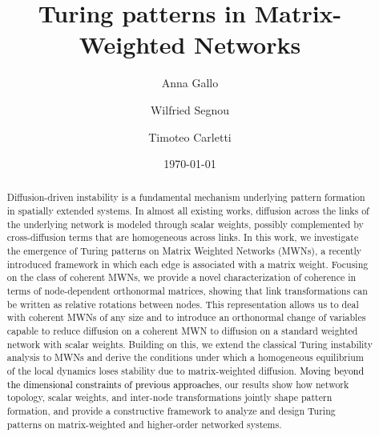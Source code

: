\documentclass[aps,showpacs,preprintnumbers,amsmath,amssymb,twocolumn,superscriptaddress,floatfix,nofootinbib,10pt,pre]{revtex4-1}
\begin{document}
\title{Turing patterns in Matrix-Weighted Networks}

\author{Anna Gallo}

\author{Wilfried Segnou}

\author{Timoteo Carletti}

\date{\today}

\begin{abstract}
Diffusion-driven instability is a fundamental mechanism underlying pattern formation in spatially extended systems. In almost all existing works, diffusion across the links of the underlying network is modeled through scalar weights, possibly complemented by cross-diffusion terms that are homogeneous across links. In this work, we investigate the emergence of Turing patterns on Matrix Weighted Networks (MWNs), a recently introduced framework in which each edge is associated with a matrix weight. Focusing on the class of coherent MWNs, we provide a novel characterization of coherence in terms of node-dependent orthonormal matrices, showing that link transformations can be written as relative rotations between nodes.
This representation allows us to deal with coherent MWNs of any size and to introduce an orthonormal change of variables capable to reduce diffusion on a coherent MWN to diffusion on a standard weighted network with scalar weights. Building on this, we extend the classical Turing instability analysis to MWNs and derive the conditions under which a homogeneous equilibrium of the local dynamics loses stability due to matrix-weighted diffusion. \textcolor{black}{Moving beyond the dimensional constraints of previous approaches,} our results show how network topology, scalar weights, and inter-node transformations jointly shape pattern formation, and provide a constructive framework to analyze and design Turing patterns on matrix-weighted and higher-order networked systems. 
\end{abstract}
\end{document}

